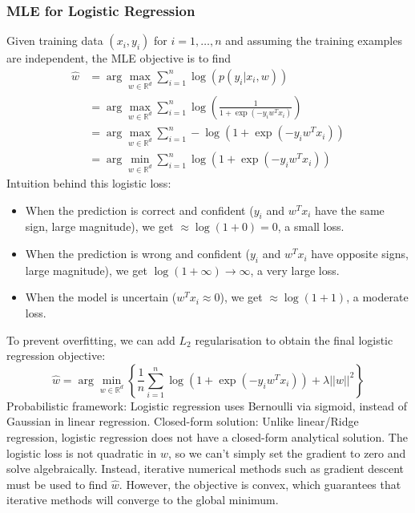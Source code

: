 \documentclass[../Probability.tex]{subfiles}
\begin{document}
\subsubsection{MLE for Logistic Regression}
Given training data $(x_i, y_i)$ for $i = 1,\ldots,n$ and assuming the training examples are independent,
the MLE objective is to find
\begin{align*}
    \hat{w} &= \arg \max_{w \in \mathbb{R}^d} \sum_{i=1}^n \log(p(y_i|x_i,w))\\
    &= \arg \max_{w \in \mathbb{R}^d} \sum_{i=1}^n \log \left(\frac{1}{1 + \exp(-y_i w^T x_i)}\right)\\
    &= \arg \max_{w \in \mathbb{R}^d} \sum_{i=1}^n -\log (1 + \exp(-y_i w^T x_i))\\
    &= \arg \min_{w \in \mathbb{R}^d} \sum_{i=1}^n \log (1 + \exp(-y_i w^T x_i))
\end{align*}
Intuition behind this logistic loss:
\begin{itemize}
    \item When the prediction is correct and confident ($y_i$ and $w^Tx_i$ have the same sign, large magnitude), we get $\approx\log(1+0)=0$, a small loss.
    \item When the prediction is wrong and confident ($y_i$ and $w^T x_i$ have opposite signs, large magnitude), we get $\log(1+\infty)\to \infty$, a very large loss.
    \item When the model is uncertain ($w^T x_i \approx 0$), we get $\approx \log(1+1)$, a moderate loss.
\end{itemize}
To prevent overfitting, we can add $L_2$ regularisation to obtain the final logistic regression objective:
$$\hat{w} = \arg \min_{w \in \mathbb{R}^d} \left\{ \frac{1}{n} \sum_{i=1}^n \log(1 + \exp(-y_i w^T x_i)) + \lambda||w||^2 \right\}$$
Probabilistic framework: Logistic regression uses Bernoulli via sigmoid, instead of Gaussian in linear regression.\newline
Closed-form solution: Unlike linear/Ridge regression, logistic regression does not have a closed-form analytical solution.
The logistic loss is not quadratic in $w$, so we can't simply set the gradient to zero and solve algebraically.
Instead, iterative numerical methods such as gradient descent must be used to find $\hat{w}$.
However, the objective is convex, which guarantees that iterative methods will converge to the global minimum.
\end{document}
